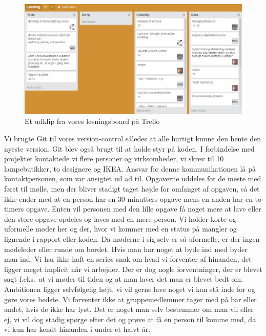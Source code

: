 \documentclass[oneside,a4paper,titlepage]{article}
\begin{document}
\begin{figure}[H]
    \centering
    \includegraphics[width=15cm]{graphics/trello}
    \caption{Et udklip fra vores løsningsboard på Trello}
    \label{fig:trello}
\end{figure} 
Vi brugte Git til vores version-control således at alle hurtigt kunne den hente den nyeste version. Git blev også brugt til at holde styr på koden. I forbindelse med projektet kontaktede vi flere personer og virksomheder, vi skrev til 10 lampebutikker, to designere og IKEA. Ansvar for denne kommunikationen lå på kontaktpersonen, som var ansigtet ud ad til. \newline\newline
Opgaverne uddeles for de meste med først til mølle, men der bliver stadigt taget højde for omfanget af opgaven, så det ikke ender med at en person har en 30 minutters opgave mens en anden har en to timers opgave. Enten vil personen med den lille opgave få noget mere at lave eller den store opgave opdeles og laves med en mere person. Vi holder korte og uformelle møder her og der, hvor vi kommer med en status på mangler og lignende i rapport eller koden. Da møderne i sig selv er så uformelle, er der ingen mødeleder eller runde om bordet. Hvis man har noget at byde ind med byder man ind. \newline\newline
Vi har ikke haft en seriøs snak om hvad vi forventer af hinanden, det ligger meget implicit når vi arbejder. Der er dog nogle forventninger, der er blevet sagt f.eks.\ at vi møder til tiden og at man laver det man er blevet bedt om. Ambitionen ligger selvfølgelig højt, vi vil gerne lave noget vi kan stå inde for og gøre vores bedste. Vi forventer ikke at gruppemedlemmer tager med på bar eller andet, hvis de ikke har lyst. Det er noget man selv bestemmer om man vil eller ej, vi vil dog stadig spørge efter det og prøve at få en person til komme med, da vi kun har kendt hinanden i under et halvt år. \newline\newline
\end{document}
